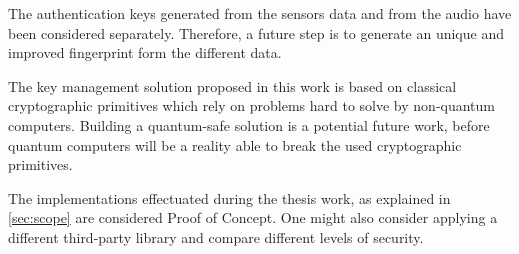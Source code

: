 The authentication keys generated from the sensors data and from the audio have been considered separately. 
Therefore, a future step is to generate an unique and improved fingerprint form the different data.

The key management solution proposed in this work is based on classical cryptographic primitives which rely on problems hard to solve by non-quantum computers.
Building a quantum-safe solution is a potential future work, before quantum computers will be a reality able to break the used cryptographic primitives.

The implementations effectuated during the thesis work, as explained in \ref{sec:scope} are considered Proof of Concept. 
One might also consider applying a different third-party library and compare different levels of security.













